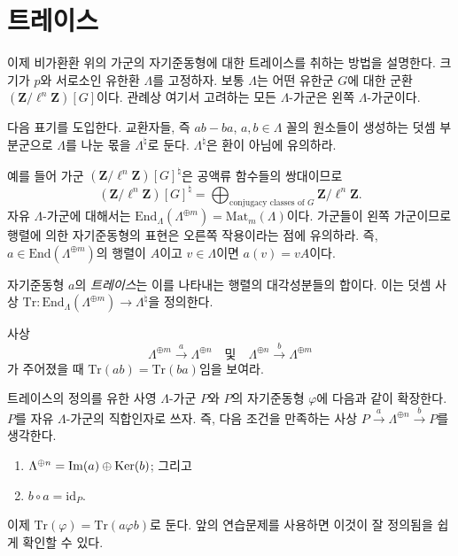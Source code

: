 \section{트레이스}
\label{section-traces}

\noindent
이제 비가환환 위의 가군의 자기준동형에 대한 트레이스를 취하는 방법을
설명한다. 크기가 $p$와 서로소인 유한환 $\Lambda$를 고정하자. 보통
$\Lambda$는 어떤 유한군 $G$에 대한 군환
$(\mathbf{Z}/\ell^n\mathbf{Z})[G]$이다. 관례상 여기서 고려하는 모든
$\Lambda$-가군은 왼쪽 $\Lambda$-가군이다.

\medskip\noindent
다음 표기를 도입한다. 교환자들, 즉
$ab-ba$, $a, b \in \Lambda$ 꼴의 원소들이 생성하는 덧셈 부분군으로
$\Lambda$를 나눈 몫을 $\Lambda^\natural$로 둔다.
$\Lambda^\natural$은 환이 아님에 유의하라.

\medskip\noindent
예를 들어 가군 $(\mathbf{Z}/\ell^n\mathbf{Z})[G]^\natural$은
공액류 함수들의 쌍대이므로
$$
(\mathbf{Z}/\ell^n\mathbf{Z})[G]^\natural
=
\bigoplus\nolimits_{\text{conjugacy classes of }G}
\mathbf{Z}/\ell^n\mathbf{Z}.
$$
자유 $\Lambda$-가군에 대해서는
$\text{End}_\Lambda(\Lambda^{\oplus m}) = \text{Mat}_m(\Lambda)$이다.
가군들이 왼쪽 가군이므로 행렬에 의한 자기준동형의 표현은 오른쪽
작용이라는 점에 유의하라. 즉,
$a \in \text{End}(\Lambda^{\oplus m})$의 행렬이 $A$이고
$v \in \Lambda$이면 $a(v) = v A$이다.

\begin{definition}
\label{definition-trace}
자기준동형 $a$의 {\it 트레이스}는 이를 나타내는 행렬의 대각성분들의
합이다. 이는 덧셈 사상
$\text{Tr} : \text{End}_\Lambda(\Lambda^{\oplus m}) \to
\Lambda^\natural$을 정의한다.
\end{definition}

\begin{exercise}
\label{exercise-trace-is-trace}
사상
$$
\Lambda^{\oplus m} \xrightarrow{a} \Lambda^{\oplus n}
\quad\text{및}\quad
\Lambda^{\oplus n} \xrightarrow{b} \Lambda^{\oplus m}
$$
가 주어졌을 때 $\text{Tr}(ab) = \text{Tr}(ba)$임을 보여라.
\end{exercise}

\noindent
트레이스의 정의를 유한 사영 $\Lambda$-가군 $P$와 $P$의 자기준동형
$\varphi$에 다음과 같이 확장한다. $P$를 자유 $\Lambda$-가군의
직합인자로 쓰자. 즉, 다음 조건을 만족하는 사상
$P \xrightarrow{a} \Lambda^{\oplus n} \xrightarrow{b} P$를 생각한다.
\begin{enumerate}
\item
$\Lambda^{\oplus n} = \mathop{\mathrm{Im}}(a) \oplus \mathop{\mathrm{Ker}}(b)$; 그리고
\item
$b\circ a = \text{id}_P$.
\end{enumerate}
이제 $\text{Tr}(\varphi) = \text{Tr}(a\varphi b)$로 둔다. 앞의
연습문제를 사용하면 이것이 잘 정의됨을 쉽게 확인할 수 있다.


